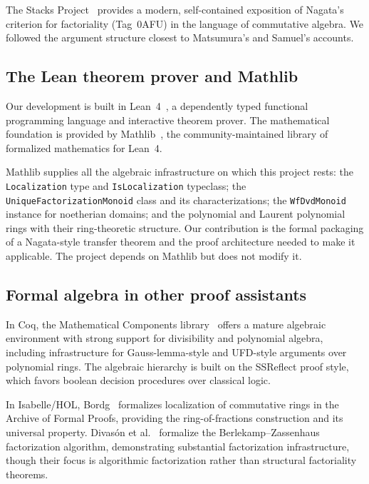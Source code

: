 \documentclass[11pt]{article}
\theoremstyle{plain}
\theoremstyle{definition}
\theoremstyle{remark}
\newcommand{\li}[1]{\texorpdfstring{\texttt{#1}}{#1}}
\begin{document}
The Stacks Project~\cite{stacks} provides a modern, self-contained exposition
of Nagata's criterion for factoriality (Tag~0AFU) in the language of
commutative algebra.
We followed the argument structure closest to Matsumura's and Samuel's accounts.

\subsection{The Lean theorem prover and Mathlib}

Our development is built in Lean~4~\cite{moura-lean4}, a dependently typed
functional programming language and interactive theorem prover.  The
mathematical foundation is provided by Mathlib~\cite{mathlib}, the
community-maintained library of formalized mathematics for Lean~4.

Mathlib supplies all the algebraic infrastructure on which this project rests:
the \li{Localization} type and \li{IsLocalization} typeclass; the
\li{UniqueFactorizationMonoid} class and its characterizations; the
\li{WfDvdMonoid} instance for noetherian domains; and the polynomial and
Laurent polynomial rings with their ring-theoretic structure.  Our contribution
is the formal packaging of a Nagata-style transfer theorem and the proof
architecture needed to make it applicable.  The project depends on Mathlib but
does not modify it.

\subsection{Formal algebra in other proof assistants}

In Coq, the Mathematical Components library~\cite{mathcomp} offers a mature
algebraic environment with strong support for divisibility and polynomial
algebra, including infrastructure for Gauss-lemma-style and UFD-style arguments
over polynomial rings.  The algebraic hierarchy is built on the SSReflect proof
style, which favors boolean decision procedures over classical logic.

In Isabelle/HOL, Bordg~\cite{bordg-localization} formalizes localization of
commutative rings in the Archive of Formal Proofs, providing the
ring-of-fractions construction and its universal property.
Divas{\'o}n et al.~\cite{divason-berlekamp} formalize the
Berlekamp--Zassenhaus factorization algorithm, demonstrating substantial
factorization infrastructure, though their focus is algorithmic factorization
rather than structural factoriality theorems.
\end{document}
